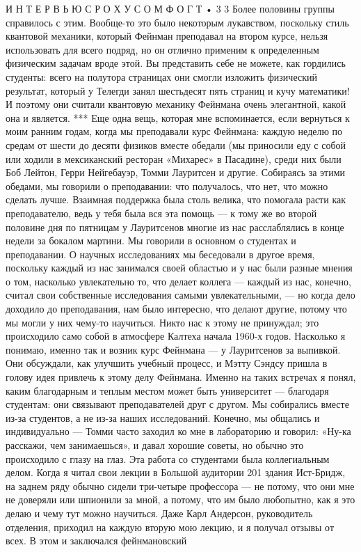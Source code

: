 \documentclass[11pt,oneside]{article}
\begin{document}
И Н Т Е Р В Ь Ю  С  Р О Х У С О М  Ф О Г Т • 3 3 Более половины группы справилось с этим. Вообще-то это было некоторым лукавством, поскольку стиль квантовой механики, который Фейнман преподавал на втором курсе, нельзя использовать для всего подряд, но он отлично применим к определенным физическим задачам вроде этой. Вы представить себе не можете, как гордились студенты: всего на полутора страницах они смогли изложить физический результат, который у Телегди занял шестьдесят пять страниц и кучу математики! И поэтому они считали квантовую механику Фейнмана очень элегантной, какой она и является. *** Еще одна вещь, которая мне вспоминается, если вернуться к моим ранним годам, когда мы преподавали курс Фейнмана: каждую неделю по средам от шести до десяти физиков вместе обедали (мы приносили еду с собой или ходили в мексиканский ресторан «Михарес» в Пасадине), среди них были Боб Лейтон, Герри Нейгебауэр, Томми Лауритсен и другие. Собираясь за этими обедами, мы говорили о преподавании: что получалось, что нет, что можно сделать лучше. Взаимная поддержка была столь велика, что помогала расти как преподавателю, ведь у тебя была вся эта помощь --- к тому же во второй половине дня по пятницам у Лауритсенов многие из нас расслаблялись в конце недели за бокалом мартини. Мы говорили в основном о студентах и преподавании. О научных исследованиях мы беседовали в другое время, поскольку каждый из нас занимался своей областью и у нас были разные мнения о том, насколько увлекательно то, что делает коллега --- каждый из нас, конечно, считал свои собственные исследования самыми увлекательными, --- но когда дело доходило до преподавания, нам было интересно, что делают другие, потому что мы могли у них чему-то научиться. Никто нас к этому не принуждал; это происходило само собой в атмосфере Калтеха начала 1960-х годов. Насколько я понимаю, именно так и возник курс Фейнмана --- у Лауритсенов за выпивкой. Они обсуждали, как улучшить учебный процесс, и Мэтту Сэндсу пришла в голову идея привлечь к этому делу Фейнмана. Именно на таких встречах я понял, каким благодарным и теплым местом может быть университет --- благодаря студентам: они связывают преподавателей друг с другом. Мы собирались вместе из-за студентов, а не из-за наших исследований. Конечно, мы общались и индивидуально --- Томми часто заходил ко мне в лабораторию и говорил: «Ну-ка расскажи, чем занимаешься», и давал хорошие советы, но обычно это происходило с глазу на глаз. Эта работа со студентами была коллегиальным делом. Когда я читал свои лекции в Большой аудитории 201 здания Ист-Бридж, на заднем ряду обычно сидели три-четыре профессора --- не потому, что они мне не доверяли или шпионили за мной, а потому, что им было любопытно, как я это делаю и чему тут можно научиться. Даже Карл Андерсон, руководитель отделения, приходил на каждую вторую мою лекцию, и я получал отзывы от всех. В этом и заключался фейнмановский\par
\end{document}
